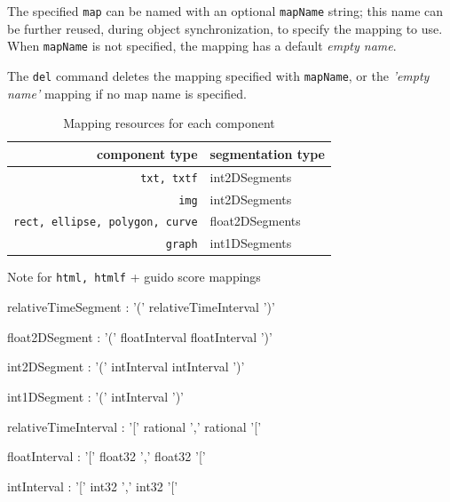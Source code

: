 \documentclass[a4paper,twoside]{report}
\newcommand{\OSC}[1]		{\texttt{#1}}
\begin{document}
The specified \OSC{map} can be named with an optional \OSC{mapName} string; this name can be further reused, during object synchronization, to specify the mapping to use. When \OSC{mapName} is not specified, the mapping has a default \emph{empty name}.

The \OSC{del} command deletes the mapping specified with \OSC{mapName}, or the \emph{'empty name'} mapping if no map name is specified.

\begin{table}[htdp]
\caption{Mapping resources for each component}
\begin{center}
\begin{tabular}{|r|l|}
\hline
component type & segmentation type \\
\hline
\OSC{txt, txtf}		& int2DSegments \\
\OSC{img}			& int2DSegments \\
\OSC{rect, ellipse, polygon, curve}	&  float2DSegments \\
\OSC{graph}			&  int1DSegments \\
\hline
\end{tabular}
\end{center}
\label{maptable}
\end{table}

Note for \OSC{html, htmlf} + guido score mappings


\begin{rail}
relativeTimeSegment : '(' relativeTimeInterval ')' 
\end{rail}
\begin{rail}
float2DSegment : '(' floatInterval floatInterval ')' 
\end{rail}
\begin{rail}
int2DSegment : '(' intInterval intInterval ')' 
\end{rail}
\begin{rail}
int1DSegment : '(' intInterval ')' 
\end{rail}


\begin{rail}
relativeTimeInterval : '[' rational ',' rational '[' 
\end{rail}
\begin{rail}
floatInterval : '[' float32 ',' float32 '['
\end{rail}
\begin{rail}
intInterval : '[' int32 ',' int32 '['
\end{rail}
\end{document}
